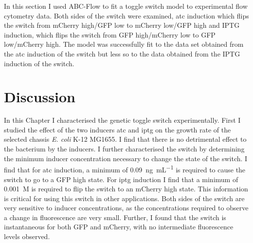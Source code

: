 
In this section I used ABC-Flow to fit a toggle switch model to experimental flow cytometry data. Both sides of the switch were examined, \acrshort{atc} induction which flips the switch from mCherry high/GFP low to mCherry low/GFP high and IPTG induction, which flips the switch from GFP high/mCherry low to GFP low/mCherry high. The model was successfully fit to the data set obtained from the \acrshort{atc} induction of the switch but less so to the data obtained from the IPTG induction of the switch. 
\section{Discussion}

In this Chapter I characterised the genetic toggle switch experimentally. First I studied the effect of the two inducers \acrshort{atc} and \acrshort{iptg} on the growth rate of the selected chassis \textit{E. coli} K-12 MG1655. I find that there is no detrimental effect to the bacterium by the inducers. I further characterised the switch by determining the minimum inducer concentration necessary to change the state of the switch. I find that for \acrshort{atc} induction, a minimum of \SI{0.09}{\nano\gram\per\milli\liter} is required to cause the switch to go to a GFP high state. For \acrshort{iptg} induction I find that a minimum of \SI{0.001}{M} is required to flip the switch to an mCherry high state. This information is critical for using this switch in other applications. Both sides of the switch are very sensitive to inducer concentrations, as the concentrations required to observe a change in fluorescence are very small. Further, I found that the switch is instantaneous for both GFP and mCherry, with no intermediate fluorescence levels observed. 

